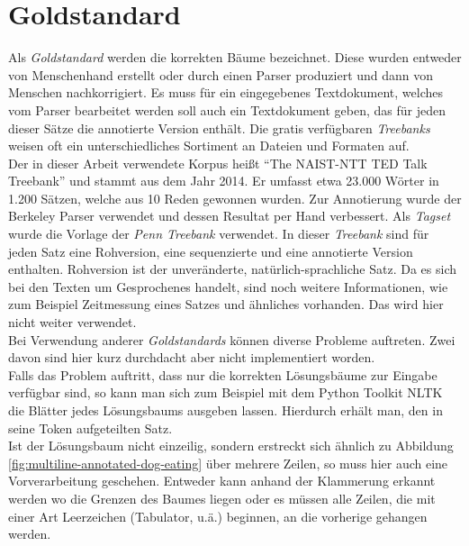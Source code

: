 \section{Goldstandard}
Als \textit{Goldstandard} werden die korrekten Bäume bezeichnet. Diese wurden entweder von Menschenhand erstellt oder durch einen Parser produziert und dann von Menschen nachkorrigiert. Es muss für ein eingegebenes Textdokument, welches vom Parser bearbeitet werden soll auch ein Textdokument geben, das für jeden dieser Sätze die annotierte Version enthält. Die gratis verfügbaren \textit{Treebanks} weisen oft ein unterschiedliches Sortiment an Dateien und Formaten auf.\\
Der in dieser Arbeit verwendete Korpus heißt ``The NAIST-NTT TED Talk Treebank'' \cite{tedtalks} und stammt aus dem Jahr 2014. Er umfasst etwa 23.000 Wörter in 1.200 Sätzen, welche aus 10 Reden gewonnen wurden. Zur Annotierung wurde der Berkeley Parser verwendet und dessen Resultat per Hand verbessert. Als \textit{Tagset} wurde die Vorlage der \textit{Penn Treebank} verwendet. 
In dieser \textit{Treebank} sind für jeden Satz eine Rohversion, eine sequenzierte und eine annotierte Version enthalten. Rohversion ist der unveränderte, natürlich-sprachliche Satz. Da es sich bei den Texten um Gesprochenes handelt, sind noch weitere Informationen, wie zum Beispiel Zeitmessung eines Satzes und ähnliches vorhanden. Das wird hier nicht weiter verwendet.\\
Bei Verwendung anderer \textit{Goldstandards} können diverse Probleme auftreten. Zwei davon sind hier kurz durchdacht aber nicht implementiert worden.\\
Falls das Problem auftritt, dass nur die korrekten Lösungsbäume zur Eingabe verfügbar sind, so kann man sich zum Beispiel mit dem Python Toolkit NLTK \cite{nltk} %
die Blätter jedes Lösungsbaums ausgeben lassen. Hierdurch erhält man, den in seine Token aufgeteilten Satz.\\
Ist der Lösungsbaum nicht einzeilig, sondern erstreckt sich ähnlich zu Abbildung \ref{fig:multiline-annotated-dog-eating}  über mehrere Zeilen, so muss hier auch eine Vorverarbeitung geschehen. Entweder kann anhand der Klammerung erkannt werden wo die Grenzen des Baumes liegen oder es müssen alle Zeilen, die mit einer Art Leerzeichen (Tabulator, u.ä.) beginnen, an die vorherige gehangen werden.

